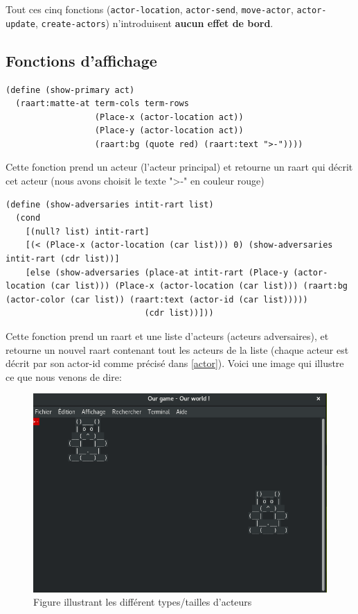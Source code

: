 \documentclass[a4paper]{article}
\begin{document}
Tout ces cinq fonctions (\verb!actor-location!, \verb!actor-send!, \verb!move-actor!, \verb!actor-update!, \verb!create-actors!) n'introduisent \textbf{aucun effet de bord}.


\subsection{Fonctions d'affichage}
\begin{lstlisting}
(define (show-primary act)
  (raart:matte-at term-cols term-rows
                  (Place-x (actor-location act))
                  (Place-y (actor-location act))
                  (raart:bg (quote red) (raart:text ">-"))))
\end{lstlisting}
Cette fonction prend un acteur (l'acteur principal) et retourne un raart qui décrit cet acteur (nous avons choisit le texte ">-" en couleur rouge) 


\begin{lstlisting}
(define (show-adversaries intit-rart list)
  (cond
    [(null? list) intit-rart]
    [(< (Place-x (actor-location (car list))) 0) (show-adversaries intit-rart (cdr list))]
    [else (show-adversaries (place-at intit-rart (Place-y (actor-location (car list))) (Place-x (actor-location (car list))) (raart:bg (actor-color (car list)) (raart:text (actor-id (car list)))))
                            (cdr list))]))
\end{lstlisting}
Cette fonction prend un raart et une liste d'acteurs (acteurs adversaires), et retourne un nouvel raart contenant tout les acteurs de la liste (chaque acteur est décrit par son actor-id comme précisé dans \ref{actor}).
Voici une image qui illustre ce que nous venons de dire:
\begin{figure}[H]
    \centering
    \includegraphics[scale=0.3]{Pictures/bear.png}
    \caption{Figure illustrant les différent types/tailles d'acteurs}
    \label{bear}
\end{figure}
\end{document}

